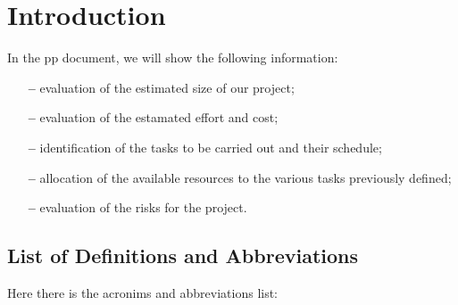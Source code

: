 \section{Introduction} \label{sec:intro}

In the \acl{pp} document, we will show the following information:

\begin{itemize}

\item[\textbf{--}]evaluation of the estimated size of our project;

\item[\textbf{--}]evaluation of the estamated effort and cost;

\item[\textbf{--}]identification of the tasks to be carried out and their schedule;

\item[\textbf{--}]allocation of the available resources to the various tasks previously defined;

\item[\textbf{--}]evaluation of the risks for the project.

\end{itemize}

\subsection{List of Definitions and Abbreviations}
Here there is the acronims and abbreviations list:

